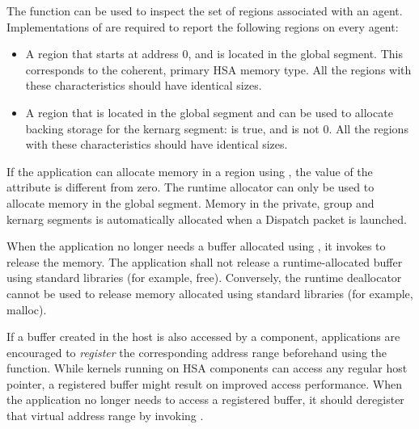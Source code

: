 \documentclass[final,oneside]{book}
\begin{document}
The function  can be used to inspect the set
of regions associated with an agent. Implementations of
 are required to report the following
regions on every agent:
\begin{itemize}[itemsep=1pt,topsep=3pt,partopsep=0pt]
\item A region that starts at address 0, and is located in the global
  segment. This corresponds to the coherent, primary HSA memory type. All the
  regions with these characteristics should have identical sizes.
\item A region that is located in the global segment and can be used to allocate
  backing storage for the kernarg segment:  is
  true, and  is not 0. All the regions
  with these characteristics should have identical sizes.
\end{itemize}

If the application can allocate memory in a region using
, the value of the attribute
 is different from zero. The runtime
allocator can only be used to allocate memory in the global segment. Memory in
the private, group and kernarg segments is automatically allocated when a
Dispatch packet is launched.

When the application no longer needs a buffer allocated using
, it invokes  to release the
memory. The application shall not release a runtime-allocated buffer using
standard libraries (for example, free). Conversely, the runtime deallocator
cannot be used to release memory allocated using standard libraries (for
example, malloc).

If a buffer created in the host is also accessed by a component, applications
are encouraged to \emph{register} the corresponding address range beforehand
using the  function. While kernels running on HSA
components can access any regular host pointer, a registered buffer might
result on improved access performance.  When the application no longer needs to
access a registered buffer, it should deregister that virtual address range by
invoking .
\end{document}
